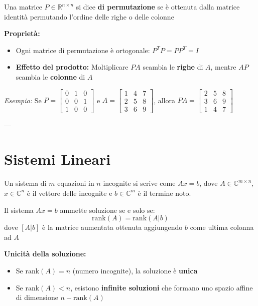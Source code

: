 \documentclass[a4paper,12pt]{article}
\begin{document}
	\begin{tcolorbox}[title=Definizione]
		Una matrice $P \in \mathbb{R}^{n \times n}$ si dice \textbf{di permutazione} se è ottenuta dalla matrice identità permutando l'ordine delle righe o delle colonne
	\end{tcolorbox}
	
	\textbf{Proprietà:}
	\begin{itemize}
		\item Ogni matrice di permutazione è ortogonale: $P^T P = P P^T = I$
		\item \textbf{Effetto del prodotto:} Moltiplicare $PA$ scambia le \textbf{righe} di $A$, mentre $AP$ scambia le \textbf{colonne} di $A$
	\end{itemize}
	
	\textit{Esempio:} Se $P = \begin{bmatrix} 0 & 1 & 0 \\ 0 & 0 & 1 \\ 1 & 0 & 0 \end{bmatrix}$ e $A = \begin{bmatrix} 1 & 4 & 7 \\ 2 & 5 & 8 \\ 3 & 6 & 9 \end{bmatrix}$, allora $PA = \begin{bmatrix} 2 & 5 & 8 \\ 3 & 6 & 9 \\ 1 & 4 & 7 \end{bmatrix}$
	
	---
	
	\section*{Sistemi Lineari}
	
	Un sistema di $m$ equazioni in $n$ incognite si scrive come $Ax = b$, dove $A \in \mathbb{C}^{m \times n}$, $x \in \mathbb{C}^n$ è il vettore delle incognite e $b \in \mathbb{C}^m$ è il termine noto.
	
	\begin{tcolorbox}[title=Teorema di Rouché-Capelli]
		Il sistema $Ax = b$ ammette soluzione se e solo se:
		\[ \text{rank}(A) = \text{rank}(A|b) \]
		dove $[A|b]$ è la matrice aumentata ottenuta aggiungendo $b$ come ultima colonna ad $A$
	\end{tcolorbox}
	
	\textbf{Unicità della soluzione:}
	\begin{itemize}
		\item Se $\text{rank}(A) = n$ (numero incognite), la soluzione è \textbf{unica}
		\item Se $\text{rank}(A) < n$, esistono \textbf{infinite soluzioni} che formano uno spazio affine di dimensione $n - \text{rank}(A)$
	\end{itemize}
	
\end{document}
